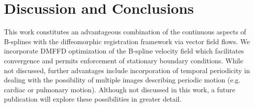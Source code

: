 \documentclass{llncs}
\begin{document}
\section{Discussion and Conclusions}
This work constitutes an advantageous combination of the continuous aspects of
B-splines with the diffeomorphic registration framework via vector field 
flows.  We incorporate
DMFFD optimization of the B-spline velocity field which facilitates 
convergence and permits enforcement of stationary boundary conditions.  
While not discussed, further advantages include incorporation of temporal 
periodicity in dealing with the possibility of multiple images describing
periodic motion (e.g. cardiac or pulmonary motion).  Although not discussed
in this work, a future publication will explore these possibilities in 
greater detail. 



\end{document}

